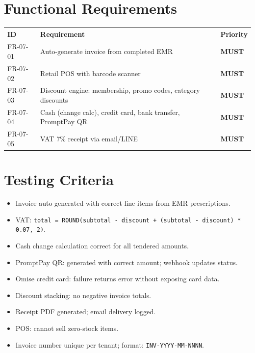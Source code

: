 \documentclass[12pt,a4paper]{report}
\newcommand{\must}{\colorbox{red!15}{\color{errorred}\textbf{\small MUST}}}
\newcommand{\testcheck}{\textcolor{successgreen}{\ding{51}}}
\begin{document}
\section{Functional Requirements}

\begin{longtable}{L{2.5cm} L{9cm} C{2cm}}
\toprule
\textbf{ID} & \textbf{Requirement} & \textbf{Priority} \\\midrule\endhead\bottomrule\endfoot
FR-07-01 & Auto-generate invoice from completed EMR & \must \\
FR-07-02 & Retail POS with barcode scanner & \must \\
FR-07-03 & Discount engine: membership, promo codes, category discounts & \must \\
FR-07-04 & Cash (change calc), credit card, bank transfer, PromptPay QR & \must \\
FR-07-05 & VAT 7\% receipt via email/LINE & \must \\
\end{longtable}

\section{Testing Criteria}

\begin{itemize}
  \item[\testcheck] Invoice auto-generated with correct line items from EMR prescriptions.
  \item[\testcheck] VAT: \texttt{total = ROUND(subtotal - discount + (subtotal - discount) * 0.07, 2)}.
  \item[\testcheck] Cash change calculation correct for all tendered amounts.
  \item[\testcheck] PromptPay QR: generated with correct amount; webhook updates status.
  \item[\testcheck] Omise credit card: failure returns error without exposing card data.
  \item[\testcheck] Discount stacking: no negative invoice totals.
  \item[\testcheck] Receipt PDF generated; email delivery logged.
  \item[\testcheck] POS: cannot sell zero-stock items.
  \item[\testcheck] Invoice number unique per tenant; format: \texttt{INV-YYYY-MM-NNNN}.
\end{itemize}

\end{document}
